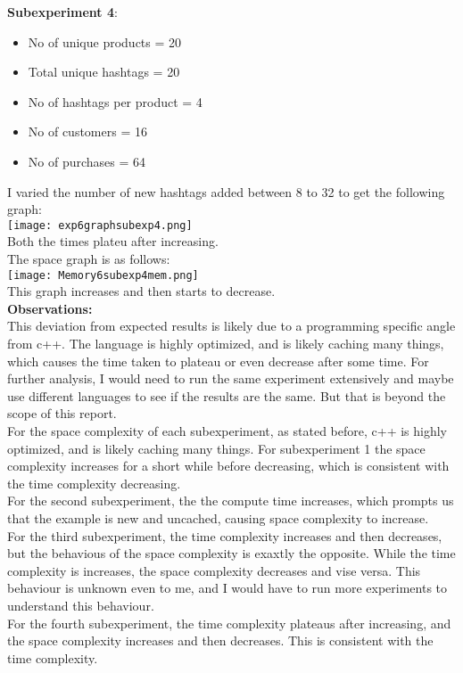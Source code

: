 \documentclass[12pt]{article}
\begin{document}
\textbf{Subexperiment 4}:\\
\begin{itemize}
    \item No of unique products = 20
    \item Total unique hashtags = 20
    \item No of hashtags per product = 4
    \item No of customers = 16
    \item No of purchases = 64
\end{itemize}
I varied the number of new hashtags added between 8 to 32 to get the following graph:\\
\texttt{[image: exp6graphsubexp4.png]}\\
Both the times plateu after increasing.\\
The space graph is as follows:\\
\texttt{[image: Memory6subexp4mem.png]}\\
This graph increases and then starts to decrease.\\

\textbf{Observations:}\\
This deviation from expected results is likely due to a programming specific angle from c++. The language is highly optimized, and is likely caching many things, which causes the time taken to plateau or even decrease after some time. For further analysis, I would need to run the same experiment extensively and maybe use different languages to see if the results are the same. But that is beyond the scope of this report.\\
For the space complexity of each subexperiment, as stated before, c++ is highly optimized, and is likely caching many things. For subexperiment 1 the space complexity increases for a short while before decreasing, which is consistent with the time complexity decreasing.\\
For the second subexperiment, the the compute time increases, which prompts us that the example is new and uncached, causing space complexity to increase.\\
For the third subexperiment, the time complexity increases and then decreases, but the behavious of the space complexity is exaxtly the opposite. While the time complexity is increases, the space complexity decreases and vise versa. This behaviour is unknown even to me, and I would have to run more experiments to understand this behaviour.\\
For the fourth subexperiment, the time complexity plateaus after increasing, and the space complexity increases and then decreases. This is consistent with the time complexity.\\
\end{document}
